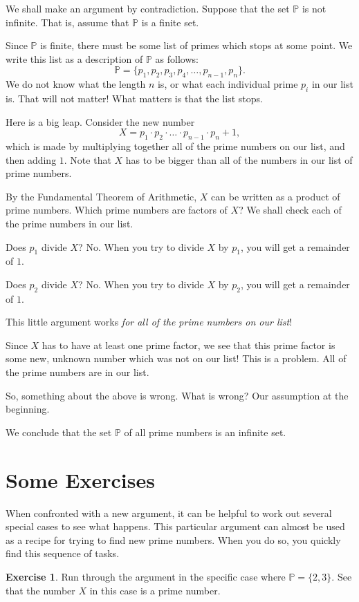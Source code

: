 \documentclass[12pt,letterpaper]{article}
\theoremstyle{definition}
\newtheorem{exercise}[question]{Exercise}
\begin{document}
We shall make an argument by contradiction.
Suppose that the set $\mathbb{P}$ is not infinite.
That is, assume that $\mathbb{P}$ is a finite set.

Since $\mathbb{P}$ is finite, there must be some list of primes which stops at some point.
We write this list as a description of $\mathbb{P}$ as follows:
\[
\mathbb{P} = \{ p_1, p_2, p_3, p_4, \ldots, p_{n-1}, p_n \}.
\]
We do not know what the length $n$ is, or what each individual prime $p_i$ in our list is.
That will not matter!
What matters is that the list stops.

Here is a big leap.
Consider the new number 
\[
X = p_1\cdot p_2 \cdot \dots \cdot p_{n-1} \cdot p_n + 1,
\]
which is made by multiplying together all of the prime numbers on our list, and then adding $1$.
Note that $X$ has to be bigger than all of the numbers in our list of prime numbers.

By the Fundamental Theorem of Arithmetic, $X$ can be written as a product of prime numbers.
Which prime numbers are factors of $X$?
We shall check each of the prime numbers in our list.

Does $p_1$ divide $X$?
No.
When you try to divide $X$ by $p_1$, you will get a remainder of $1$.

Does $p_2$ divide $X$?
No.
When you try to divide $X$ by $p_2$, you will get a remainder of $1$.

This little argument works \emph{for all of the prime numbers on our list}!

Since $X$ has to have at least one prime factor, we see that this prime factor is some new, unknown number which was not on our list!
This is a problem.
All of the prime numbers are in our list.

So, something about the above is wrong.
What is wrong?
Our assumption at the beginning.

We conclude that the set $\mathbb{P}$ of all prime numbers is an infinite set.

\section{Some Exercises}

When confronted with a new argument, it can be helpful to work out several special cases to see what happens. 
This particular argument can almost be used as a recipe for trying to find new prime numbers.
When you do so, you quickly find this sequence of tasks.

\begin{exercise}
Run through the argument in the specific case where $\mathbb{P} =\{2, 3\}$.
See that the number $X$ in this case is a prime number.
\end{exercise}
\end{document}
